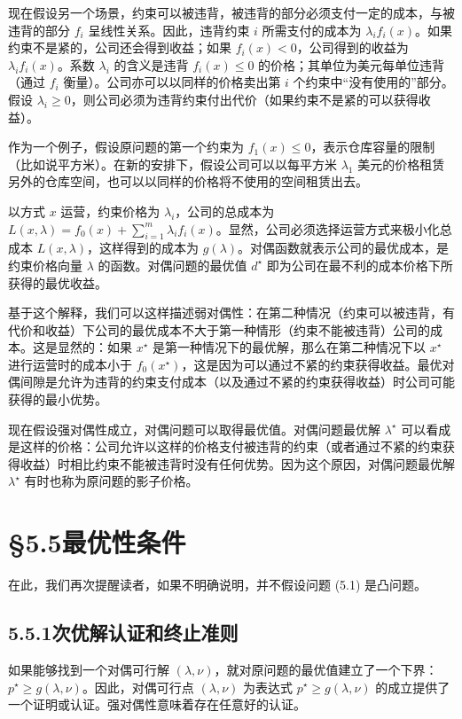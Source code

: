 \documentclass[UTF8,12pt,a4paper,fontset=fandol]{ctexart}
\begin{document}
现在假设另一个场景，约束可以被违背，被违背的部分必须支付一定的成本，与被违背的部分 $f_i$ 呈线性关系。因此，违背约束 $i$ 所需支付的成本为 $\lambda_i f_i(x)$。如果约束不是紧的，公司还会得到收益；如果 $f_i(x)<0$，公司得到的收益为 $\lambda_i f_i(x)$。系数 $\lambda_i$ 的含义是违背 $f_i(x)\leq 0$ 的价格；其单位为美元每单位违背（通过 $f_i$ 衡量）。公司亦可以以同样的价格卖出第 $i$ 个约束中“没有使用的”部分。假设 $\lambda_i\geq 0$，则公司必须为违背约束付出代价（如果约束不是紧的可以获得收益）。

作为一个例子，假设原问题的第一个约束为 $f_1(x)\leq 0$，表示仓库容量的限制（比如说平方米）。在新的安排下，假设公司可以以每平方米 $\lambda_1$ 美元的价格租赁另外的仓库空间，也可以以同样的价格将不使用的空间租赁出去。

以方式 $x$ 运营，约束价格为 $\lambda_i$，公司的总成本为 $L(x,\lambda)=f_0(x)+\sum_{i=1}^m\lambda_i f_i(x)$。显然，公司必须选择运营方式来极小化总成本 $L(x,\lambda)$，这样得到的成本为 $g(\lambda)$。对偶函数就表示公司的最优成本，是约束价格向量 $\lambda$ 的函数。对偶问题的最优值 $d^\star$ 即为公司在最不利的成本价格下所获得的最优收益。

基于这个解释，我们可以这样描述弱对偶性：在第二种情况（约束可以被违背，有代价和收益）下公司的最优成本不大于第一种情形（约束不能被违背）公司的成本。这是显然的：如果 $x^\star$ 是第一种情况下的最优解，那么在第二种情况下以 $x^\star$ 进行运营时的成本小于 $f_0(x^\star)$，这是因为可以通过不紧的约束获得收益。最优对偶间隙是允许为违背的约束支付成本（以及通过不紧的约束获得收益）时公司可能获得的最小优势。

现在假设强对偶性成立，对偶问题可以取得最优值。对偶问题最优解 $\lambda^\star$ 可以看成是这样的价格：公司允许以这样的价格支付被违背的约束（或者通过不紧的约束获得收益）时相比约束不能被违背时没有任何优势。因为这个原因，对偶问题最优解 $\lambda^\star$ 有时也称为原问题的影子价格。

\section*{§5.5\quad 最优性条件}

在此，我们再次提醒读者，如果不明确说明，并不假设问题 (5.1) 是凸问题。

\subsection*{5.5.1\quad 次优解认证和终止准则}

如果能够找到一个对偶可行解 $(\lambda,\nu)$，就对原问题的最优值建立了一个下界：$p^\star\geq g(\lambda,\nu)$。因此，对偶可行点 $(\lambda,\nu)$ 为表达式 $p^\star\geq g(\lambda,\nu)$ 的成立提供了一个证明或认证。强对偶性意味着存在任意好的认证。
\end{document}
